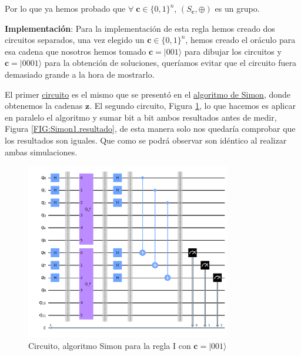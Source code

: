  Por lo que ya hemos probado que $\forall\;\mathbf{c}\in \{0,1\}^{n}$, $(S_{\mathbf{c}},\oplus)$ es un grupo.\newline

 \textbf{Implementación}: Para la implementación de esta regla hemos creado dos circuitos separados, una vez elegido un $\mathbf{c}\in \{0,1\}^{n}$, hemos creado el oráculo para esa cadena que nosotros hemos tomado $\mathbf{c}=|001\rangle$ para dibujar los circuitos y $\mathbf{c}=|0001\rangle$ para la obtención de soluciones, queríamos evitar que el circuito fuera demasiado grande a la hora de mostrarlo.\newline

 El primer \hyperref[Fig:CircuitoSimon1]{circuito} es el mismo que se presentó en el \hyperref[Sec3.5:Simon]{algoritmo de Simon}, donde obtenemos la cadenas $\mathbf{z}$. El segundo circuito, Figura \ref{Fig:CircuitoSimonR1}, lo que hacemos es aplicar en paralelo el algoritmo y sumar bit a bit ambos resultados antes de medir, Figura \ref{FIG:Simon1.resultado}, de esta manera solo nos quedaría comprobar que los resultados son iguales. Que como se podrá observar son idéntico al realizar ambas simulaciones.\newline

 \begin{figure}[H]
    \centering
    \includegraphics[width=0.8\textwidth]{TFG/imagenes/simonregla.png}
    \caption{Circuito, algoritmo Simon para la regla I con $\mathbf{c}=|001\rangle$}
    \label{Fig:CircuitoSimonR1}
 \end{figure}

